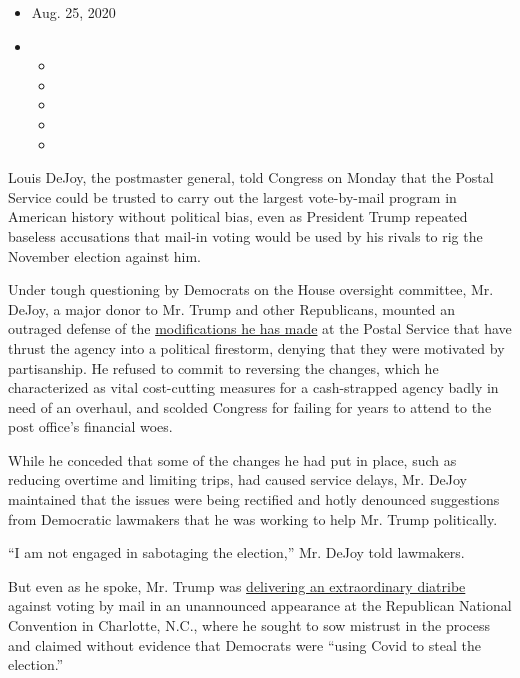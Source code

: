 \begin{itemize}
\item
  Aug. 25, 2020
\item
  \begin{itemize}
  \item
  \item
  \item
  \item
  \item
  \end{itemize}
\end{itemize}

Louis DeJoy, the postmaster general, told Congress on Monday that the
Postal Service could be trusted to carry out the largest vote-by-mail
program in American history without political bias, even as President
Trump repeated baseless accusations that mail-in voting would be used by
his rivals to rig the November election against him.

Under tough questioning by Democrats on the House oversight committee,
Mr. DeJoy, a major donor to Mr. Trump and other Republicans, mounted an
outraged defense of the
\href{https://www.nytimes3xbfgragh.onion/2020/07/31/us/politics/trump-usps-mail-delays.html}{modifications
he has made} at the Postal Service that have thrust the agency into a
political firestorm, denying that they were motivated by partisanship.
He refused to commit to reversing the changes, which he characterized as
vital cost-cutting measures for a cash-strapped agency badly in need of
an overhaul, and scolded Congress for failing for years to attend to the
post office's financial woes.

While he conceded that some of the changes he had put in place, such as
reducing overtime and limiting trips, had caused service delays, Mr.
DeJoy maintained that the issues were being rectified and hotly
denounced suggestions from Democratic lawmakers that he was working to
help Mr. Trump politically.

``I am not engaged in sabotaging the election,'' Mr. DeJoy told
lawmakers.

But even as he spoke, Mr. Trump was
\href{https://www.nytimes3xbfgragh.onion/live/2020/08/24/us/rnc-convention-election/democrats-are-using-covid-to-steal-the-election-trump-says-in-an-inflammatory-rnc-speech}{delivering
an extraordinary diatribe} against voting by mail in an unannounced
appearance at the Republican National Convention in Charlotte, N.C.,
where he sought to sow mistrust in the process and claimed without
evidence that Democrats were ``using Covid to steal the election.''

